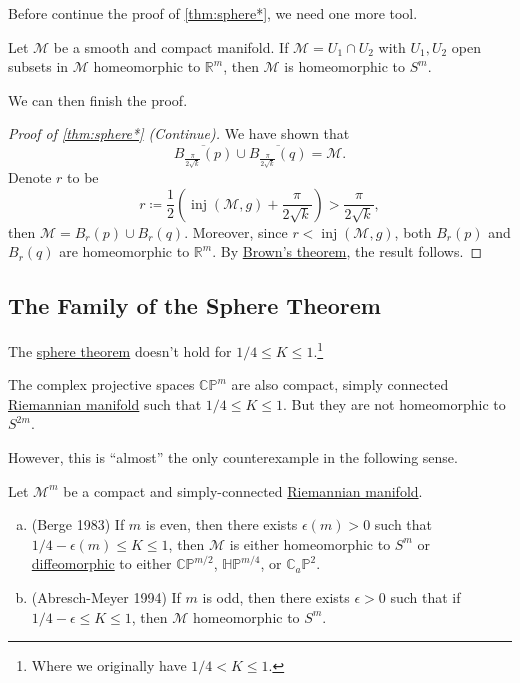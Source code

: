 Before continue the proof of \autoref{thm:sphere*}, we need one more tool.

\begin{theorem}\label{thm:Brown}
	Let \(\mathcal{M} \) be a smooth and compact manifold. If \(\mathcal{M} = U_1 \cap U_2\) with \(U_1, U_2\) open subsets in \(\mathcal{M} \) homeomorphic to \(\mathbb{R} ^m\), then \(\mathcal{M} \) is homeomorphic to \(S^m\).
\end{theorem}

We can then finish the proof.

\begin{proof}[Proof of \autoref{thm:sphere*} (Continue)]
	We have shown that
	\[
		\overline{B_{\frac{\pi}{2\sqrt{k} }}(p)} \cup \overline{B_{\frac{\pi}{2 \sqrt{k} }}(q)} = \mathcal{M}.
	\]
	Denote \(r\) to be
	\[
		r \coloneqq \frac{1}{2} \left( \mathop{\mathrm{inj}}(\mathcal{M} , g) + \frac{\pi}{2 \sqrt{k} } \right) > \frac{\pi}{2 \sqrt{k}} ,
	\]
	then \(\mathcal{M} = B_r(p) \cup B_r(q)\). Moreover, since \(r < \mathop{\mathrm{inj}}(\mathcal{M} , g) \), both \(B_r(p)\) and \(B_r(q)\) are homeomorphic to \(\mathbb{R} ^m\). By \hyperref[thm:Brown]{Brown's theorem}, the result follows.
\end{proof}

\subsection{The Family of the Sphere Theorem}
The \hyperref[thm:sphere*]{sphere theorem} doesn't hold for \(1 / 4 \leq K \leq 1\).\footnote{Where we originally have \(1 / 4 < K \leq 1\).}

\begin{eg}
	The complex projective spaces \(\mathbb{C} \mathbb{P} ^m\) are also compact, simply connected \hyperref[def:Riemannian-manifold]{Riemannian manifold} such that \(1 / 4 \leq K \leq 1\). But they are not homeomorphic to \(S^{2m} \).
\end{eg}

However, this is ``almost'' the only counterexample in the following sense.

\begin{theorem}
	Let \(\mathcal{M} ^m\) be a compact and simply-connected \hyperref[def:Riemannian-manifold]{Riemannian manifold}.
	\begin{enumerate}[(a)]
		\item (Berge 1983) If \(m\) is even, then there exists \(\epsilon (m) > 0\) such that \(1 / 4 - \epsilon (m) \leq K \leq 1\), then \(\mathcal{M} \) is either homeomorphic to \(S^m\) or \hyperref[def:diffeomorphic]{diffeomorphic} to either \(\mathbb{C} \mathbb{P} ^{m / 2}\), \(\mathbb{H} \mathbb{P} ^{m / 4}\), or \(\mathbb{C} _a \mathbb{P} ^2\).
		\item (Abresch-Meyer 1994) If \(m\) is odd, then there exists \(\epsilon > 0\) such that if \(1 / 4 - \epsilon \leq K \leq 1\), then \(\mathcal{M} \) homeomorphic to \(S^m\).
	\end{enumerate}
\end{theorem}

